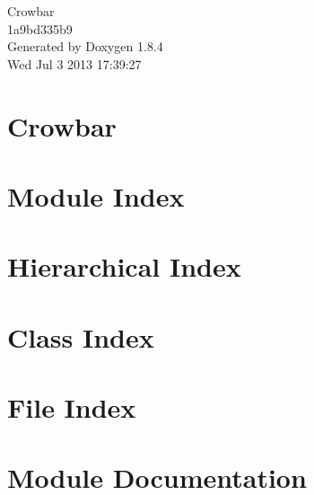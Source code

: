 \documentclass[twoside]{book}
\newcommand{\clearemptydoublepage}{%
  \newpage{\pagestyle{empty}\cleardoublepage}%
}
\begin{document}
\hypersetup{pageanchor=false}
\begin{titlepage}
\vspace*{7cm}
\begin{center}%
{\Large Crowbar \\[1ex]\large 1a9bd335b9 }\\
\vspace*{1cm}
{\large Generated by Doxygen 1.8.4}\\
\vspace*{0.5cm}
{\small Wed Jul 3 2013 17:39:27}\\
\end{center}
\end{titlepage}
\clearemptydoublepage
\tableofcontents
\clearemptydoublepage
{}
\hypersetup{pageanchor=true}

\chapter{Crowbar}
\label{md_README}
\hypertarget{md_README}{}

\chapter{Module Index}

\chapter{Hierarchical Index}

\chapter{Class Index}

\chapter{File Index}

\chapter{Module Documentation}


\end{document}
